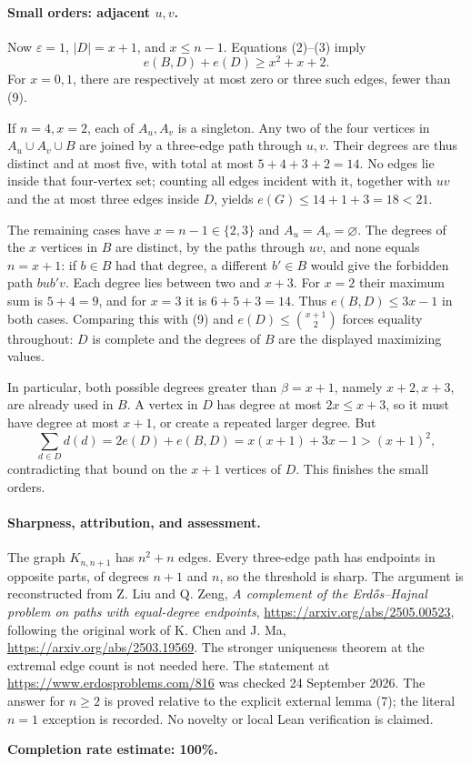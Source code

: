 \paragraph{Small orders: adjacent \(u,v\).}
Now \(\varepsilon=1\), \(|D|=x+1\), and \(x\leq n-1\). Equations (2)--(3) imply
\[
 e(B,D)+e(D)\geq x^2+x+2.
\tag{9}
\]
For \(x=0,1\), there are respectively at most zero or three such edges, fewer than (9).

If \(n=4,x=2\), each of \(A_u,A_v\) is a singleton. Any two of the four vertices in \(A_u\cup A_v\cup B\) are joined by a three-edge path through \(u,v\). Their degrees are thus distinct and at most five, with total at most \(5+4+3+2=14\). No edges lie inside that four-vertex set; counting all edges incident with it, together with \(uv\) and the at most three edges inside \(D\), yields \(e(G)\leq14+1+3=18<21\).

The remaining cases have \(x=n-1\in\{2,3\}\) and \(A_u=A_v=\varnothing\). The degrees of the \(x\) vertices in \(B\) are distinct, by the paths through \(uv\), and none equals \(n=x+1\): if \(b\in B\) had that degree, a different \(b'\in B\) would give the forbidden path \(bub'v\). Each degree lies between two and \(x+3\). For \(x=2\) their maximum sum is \(5+4=9\), and for \(x=3\) it is \(6+5+3=14\). Thus
\(e(B,D)\leq3x-1\) in both cases. Comparing this with (9) and \(e(D)\leq\binom{x+1}{2}\) forces equality throughout: \(D\) is complete and the degrees of \(B\) are the displayed maximizing values.

In particular, both possible degrees greater than \(\beta=x+1\), namely \(x+2,x+3\), are already used in \(B\). A vertex in \(D\) has degree at most \(2x\leq x+3\), so it must have degree at most \(x+1\), or create a repeated larger degree. But
\[
 \sum_{d\in D}d(d)=2e(D)+e(B,D)
 =x(x+1)+3x-1>(x+1)^2,
\]
contradicting that bound on the \(x+1\) vertices of \(D\). This finishes the small orders.

\paragraph{Sharpness, attribution, and assessment.}
The graph \(K_{n,n+1}\) has \(n^2+n\) edges. Every three-edge path has endpoints in opposite parts, of degrees \(n+1\) and \(n\), so the threshold is sharp. The argument is reconstructed from Z. Liu and Q. Zeng, \emph{A complement of the Erd\H{o}s--Hajnal problem on paths with equal-degree endpoints}, \url{https://arxiv.org/abs/2505.00523}, following the original work of K. Chen and J. Ma, \url{https://arxiv.org/abs/2503.19569}. The stronger uniqueness theorem at the extremal edge count is not needed here. The statement at \url{https://www.erdosproblems.com/816} was checked 24 September 2026. The answer for \(n\geq2\) is proved relative to the explicit external lemma (7); the literal \(n=1\) exception is recorded. No novelty or local Lean verification is claimed.

\textbf{Completion rate estimate: 100\%.}
